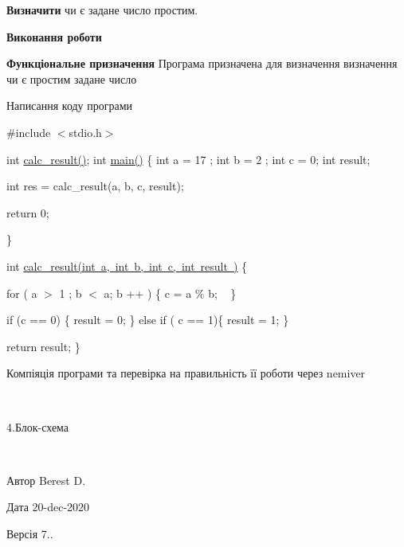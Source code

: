 
\begin{DoxyEnumerate}
\item {\bfseries{Визначити}} чи є задане число простим.
\end{DoxyEnumerate}

{\bfseries{Виконання роботи}}
\begin{DoxyEnumerate}
\item {\bfseries{Функціональне призначення}} Програма призначена для визначення визначення чи є простим задане число
\item Написання коду програми
\end{DoxyEnumerate}

\#include $<$stdio.\+h$>$

int \mbox{\hyperlink{main_8c_a6c0ce3059818e6073803bc7067e92fba}{calc\+\_\+result()}}; int \mbox{\hyperlink{main_8c_ae66f6b31b5ad750f1fe042a706a4e3d4}{main()}} \{ int a = 17 ; int b = 2 ; int c = 0; int result;

int res = calc\+\_\+result(a, b, c, result);

\begin{DoxyVerb}return 0;
\end{DoxyVerb}
 \}

int \mbox{\hyperlink{main_8c_a799e352f51ba6166c734a6c3e3f83140}{calc\+\_\+result(int a, int b, int c, int result )}} \{

for ( a $>$ 1 ; b $<$ a; b ++ ) \{ c = a \% b; ~\newline
 \}

if (c == 0) \{ result = 0; \} else if ( c == 1)\{ result = 1; \}

return result; \}


\begin{DoxyEnumerate}
\item Компіяція програми та перевірка на правильність її роботи через nemiver
\end{DoxyEnumerate}

 ~\newline


4.Блок-\/схема

 ~\newline


\begin{DoxyAuthor}{Автор}
Berest D. 
\end{DoxyAuthor}
\begin{DoxyDate}{Дата}
20-\/dec-\/2020 
\end{DoxyDate}
\begin{DoxyVersion}{Версія}
7.. 
\end{DoxyVersion}
